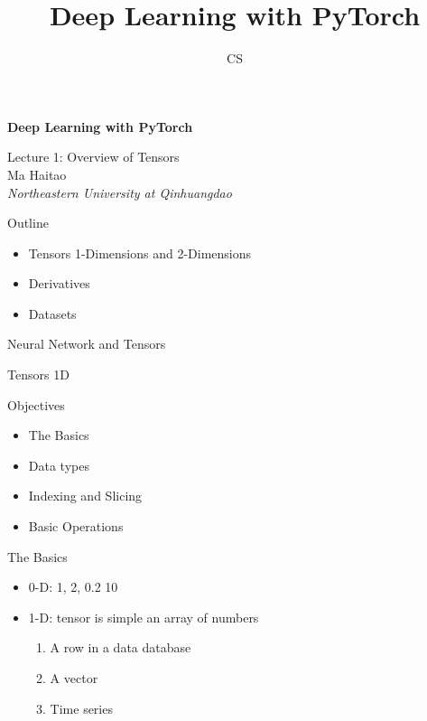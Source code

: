 \documentclass[14 pt]{beamer}
\author[mht]{CS}
\title[Deep Learning with PyTorch]{Deep Learning with PyTorch}
\institute{Northeastern University at Qinhuangdao}
\let\olditem\item
\renewcommand{\item}{\olditem\vspace{4pt}}
\newcommand{\comment}[1]{\textcolor{comment}{\footnotesize{#1}\normalsize}} %
\newcommand{\Comment}[1]{\textcolor{Comment}{\footnotesize{#1}\normalsize}} %
\newcommand{\COMMENT}[1]{\textcolor{COMMENT}{\footnotesize{#1}\normalsize}} %
\begin{document}
\begin{frame}[c]
\begin{center}
	\textcolor{normal text.fg!50!Comment}{\textbf{\Large{Deep Learning with PyTorch}}}
	\vspace{4em}

    \COMMENT{\large{Lecture 1: Overview of Tensors}} \\
\vspace{4em}
    \Comment{{Ma Haitao}} \\
\comment{\textit{Northeastern University at Qinhuangdao}}\\
\end{center}
\end{frame}

\begin{frame}{Outline}
  \begin{itemize}
  \item Tensors 1-Dimensions and 2-Dimensions
  \item Derivatives
  \item Datasets 
\end{itemize}
\end{frame}

\begin{frame}{Neural Network and Tensors}

\end{frame}

\begin{frame}
\begin{center}
\Large{Tensors 1D} 
\end{center}
\end{frame}

\begin{frame}{Objectives}
\begin{itemize}
  \item The Basics
  \item Data types
  \item Indexing and Slicing
  \item Basic Operations
  \end{itemize}
\end{frame}

\begin{frame}
  \Large{The Basics}
\end{frame}

\begin{frame}
  \begin{itemize}
  \item 0-D: 1, 2, 0.2 10
  \item 1-D: tensor is simple an array of numbers
    \begin{enumerate}
    \item A row in a data database
    \item A vector
    \item Time series
    \end{enumerate}
  \end{itemize}
\end{frame}
\end{document}
